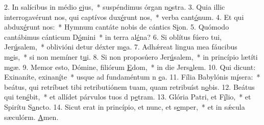 2. In salícibus in médio \uline{e}jus,~* suspéndimus órgan n\uline{o}stra.
3. Quia illic interrogavérunt nos, qui captívos dux\uline{é}runt nos,~* verba cant\uline{ó}num.
4. Et qui abdux\uline{é}runt nos:~* Hymnum cantáte nobis de cántics S\uline{i}on.
5. Quómodo cantábimus cánticum D\uline{ó}mini~* in terra al\uline{é}na?
6. Si oblítus fúero tui, Jer\uline{ú}salem,~* oblivióni detur déxter m\uline{e}a.
7. Adhǽreat lingua mea fáucibus m\uline{e}is,~* si non memíner t\uline{u}i.
8. Si non proposúero Jer\uline{ú}salem,~* in princípio lætíti m\uline{e}æ.
9. Memor esto, Dómine, filiórum \uline{E}dom,~* in die Jers\uline{a}lem.
10. Qui dicunt: Exinaníte, exinan\uline{í}te~* usque ad fundaméntum n \uline{e}a.
11. Fília Babylónis m\uline{í}sera:~* beátus, qui retríbuet tibi retributiónem tuam, quam retribuíst n\uline{o}bis.
12. Beátus qui ten\uline{é}bit,~* et allídet párvulos tuos d p\uline{e}tram.
13. Glória Patri, et F\uline{í}lio,~* et Spirítu S\uline{a}ncto.
14. Sicut erat in princípio, et nunc, et s\uline{e}mper,~* et in sǽcula sæculórm. \uline{A}men.
